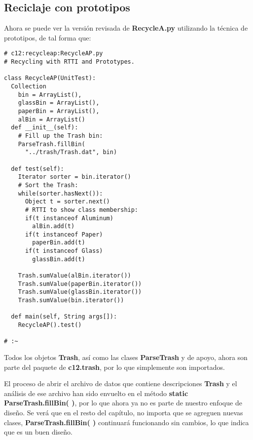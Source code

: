 \subsection*{Reciclaje con prototipos}
\label{subsec:rcp}


Ahora se puede ver la versión revisada de \textbf{RecycleA.py} utilizando la técnica de prototipos, de tal forma que:     \newline

\begin{lstlisting} 
# c12:recycleap:RecycleAP.py  
# Recycling with RTTI and Prototypes. 

class RecycleAP(UnitTest): 
  Collection 
    bin = ArrayList(),  
    glassBin = ArrayList(), 
    paperBin = ArrayList(), 
    alBin = ArrayList() 
  def __init__(self): 
    # Fill up the Trash bin: 
    ParseTrash.fillBin( 
      "../trash/Trash.dat", bin) 
      
  def test(self): 
    Iterator sorter = bin.iterator() 
    # Sort the Trash: 
    while(sorter.hasNext()): 
      Object t = sorter.next() 
      # RTTI to show class membership: 
      if(t instanceof Aluminum) 
        alBin.add(t) 
      if(t instanceof Paper) 
        paperBin.add(t) 
      if(t instanceof Glass) 
        glassBin.add(t) 
        
    Trash.sumValue(alBin.iterator()) 
    Trash.sumValue(paperBin.iterator()) 
    Trash.sumValue(glassBin.iterator()) 
    Trash.sumValue(bin.iterator()) 
    
  def main(self, String args[]): 
    RecycleAP().test() 
    
# :~     
\end{lstlisting}

Todos los objetos \textbf{Trash}, así como las clases \textbf{ParseTrash} y de apoyo, ahora son parte del paquete de \textbf{c12.trash}, por lo que simplemente son importados.     \newline

El proceso de abrir el archivo de datos que contiene descripciones \textbf{Trash} y el análisis de ese archivo han sido envuelto en el método \textbf{static} \textbf{ParseTrash.fillBin( )}, por lo que ahora ya no es parte de nuestro enfoque de diseño. Se verá que en el resto del capítulo, no importa que se agreguen nuevas clases, \textbf{ParseTrash.fillBin( )} continuará funcionando sin cambios, lo que indica que es un buen diseño.   \newline

